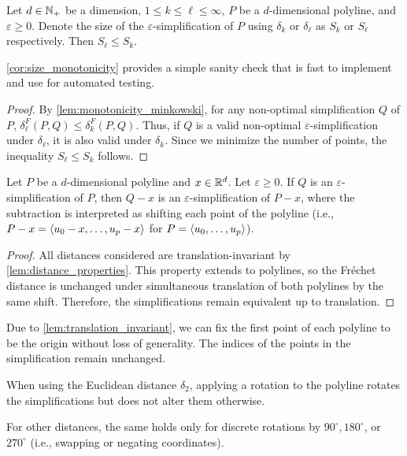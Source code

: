 \begin{corollary}\label{cor:size_monotonicity}
	Let \(d \in \mathbb{N}_+\) be a dimension, \(1 \leq k \leq \ell \leq \infty\),
  \(P\) be a \(d\)-dimensional polyline, and \(\varepsilon \geq 0\). Denote the size of the \(\varepsilon\)-simplification of \(P\) using \(\delta_k\) or \(\delta_\ell\) as \(S_k\) or \(S_\ell\) respectively. Then \(S_\ell \leq S_k\).
\end{corollary}

\cref{cor:size_monotonicity} provides a simple sanity check that is fast to implement and use for automated testing.

\begin{proof}
	By \cref{lem:monotonicity_minkowski}, for any non-optimal simplification \(Q\) of \(P\), \(\delta_\ell^F(P, Q) \leq \delta_k^F(P, Q)\). Thus, if \(Q\) is a valid non-optimal \(\varepsilon\)-simplification under \(\delta_\ell\), it is also valid under \(\delta_k\). Since we minimize the number of points, the inequality \(S_\ell \leq S_k\) follows.
\end{proof}

\begin{lemma}\label{lem:translation_invariant}
	Let \(P\) be a \(d\)-dimensional polyline and \(x \in \mathbb{R}^d\). Let \(\varepsilon \geq 0\). If \(Q\) is an \(\varepsilon\)-simplification of \(P\), then \(Q-x\) is an \(\varepsilon\)-simplification of \(P-x\), where the subtraction is interpreted as shifting each point of the polyline (i.e., \(P-x = \left\langle u_0 - x, \dots, u_p - x\right\rangle\) for \(P = \left\langle u_0,\dots, u_p\right\rangle\)).
\end{lemma}

\begin{proof}
	All distances considered are translation-invariant by \cref{lem:distance_properties}. This property extends to polylines, so the Fréchet distance is unchanged under simultaneous translation of both polylines by the same shift. Therefore, the simplifications remain equivalent up to translation.
\end{proof}

Due to \cref{lem:translation_invariant}, we can fix the first point of each polyline to be the origin without loss of generality. The indices of the points in the simplification remain unchanged.

\begin{corollary}\label{cor:rot_inv}
  When using the Euclidean distance \(\delta_2\), applying a rotation to the polyline rotates the simplifications but does not alter them otherwise.

	For other distances, the same holds only for discrete rotations by \(90^\circ, 180^\circ\), or \(270^\circ\) (i.e., swapping or negating coordinates).
\end{corollary}

